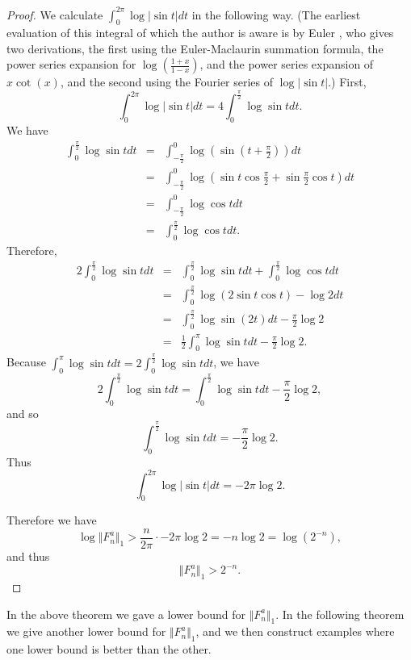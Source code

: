 \documentclass{amsart}
\newcommand{\norm}[1]{\Vert #1 \Vert}
\begin{document}
\begin{proof}
We calculate  $\int_0^{2\pi} \log |\sin t|dt$ in the following way. (The earliest evaluation of this integral of which the author is aware
is by Euler \cite{E393}, who gives two derivations, the first using the Euler-Maclaurin summation formula, the power
series expansion for $\log\left( \frac{1+x}{1-x} \right)$, and the power series expansion of $x\cot(x)$,
and the second using the Fourier series of
$\log | \sin t|$.)
First, 
\[
\int_0^{2\pi} \log |\sin t|dt=4\int_0^{\frac{\pi}{2}} \log \sin t dt.
\]
We have
\begin{eqnarray*}
\int_0^{\frac{\pi}{2}} \log \sin t dt&=&\int_{-\frac{\pi}{2}}^0 \log\left( \sin\left( t+\frac{\pi}{2} \right) \right) dt\\
&=&\int_{-\frac{\pi}{2}}^0 \log\left(\sin t \cos \frac{\pi}{2}+\sin \frac{\pi}{2}\cos t \right) dt\\
&=&\int_{-\frac{\pi}{2}}^0 \log \cos t dt\\
&=&\int_0^{\frac{\pi}{2}} \log \cos t dt.
\end{eqnarray*}
Therefore,
\begin{eqnarray*}
2\int_0^{\frac{\pi}{2}} \log \sin t dt &=&\int_0^{\frac{\pi}{2}} \log \sin t dt+ \int_0^{\frac{\pi}{2}} \log \cos t dt\\
&=&\int_0^{\frac{\pi}{2}} \log \left( 2 \sin t \cos t \right)-\log 2 dt\\
&=&\int_0^{\frac{\pi}{2}} \log \sin(2t) dt -\frac{\pi}{2} \log 2\\
&=&\frac{1}{2} \int_0^{\pi} \log \sin t dt -\frac{\pi}{2} \log 2.
\end{eqnarray*}
Because $\int_0^\pi \log \sin t dt=2\int_0^{\frac{\pi}{2}} \log \sin t dt$, we have
\[
2\int_0^{\frac{\pi}{2}} \log \sin t dt=\int_0^{\frac{\pi}{2}} \log \sin t dt-\frac{\pi}{2}\log 2,
\]
and so
\[
\int_0^{\frac{\pi}{2}} \log \sin t dt=-\frac{\pi}{2}\log 2. 
\]
Thus
\[
\int_0^{2\pi} \log |\sin t|dt=-2\pi \log 2.
\]

Therefore we have
\[
\log \norm{F_n^a}_1 > \frac{n}{2\pi} \cdot -2 \pi \log 2 = -n\log 2 = \log(2^{-n}),
\]
and thus
\[
\norm{F_n^a}_1 > 2^{-n}.
\]
\end{proof}

In the above theorem we gave a lower bound for $\norm{F_n^a}_1$. In the following theorem we give another lower bound for $\norm{F_n^a}_1$, and we then construct
examples where one lower bound is better than the other.
\end{document}
